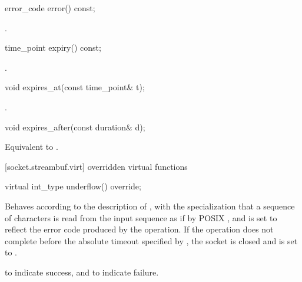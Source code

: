 \begin{itemdecl}
error_code error() const;
\end{itemdecl}

\begin{itemdescr}
\pnum
\returns {}.
\end{itemdescr}

\begin{itemdecl}
time_point expiry() const;
\end{itemdecl}

\begin{itemdescr}
\pnum
\returns {}.
\end{itemdescr}

\begin{itemdecl}
void expires_at(const time_point& t);
\end{itemdecl}

\begin{itemdescr}
\pnum
\postconditions {}.
\end{itemdescr}

\begin{itemdecl}
void expires_after(const duration& d);
\end{itemdecl}

\begin{itemdescr}
\pnum
\effects Equivalent to .
\end{itemdescr}



[socket.streambuf.virt]{ overridden virtual functions}

\begin{itemdecl}
virtual int_type underflow() override;
\end{itemdecl}

\begin{itemdescr}
\pnum
\effects Behaves according to the description of , with the specialization that a sequence of characters is read from the input sequence as if by POSIX , and  is set to reflect the error code produced by the operation. If the operation does not complete before the absolute timeout specified by , the socket is closed and  is set to .

\pnum
\returns {} to indicate success,
and  to indicate failure.
\end{itemdescr}

